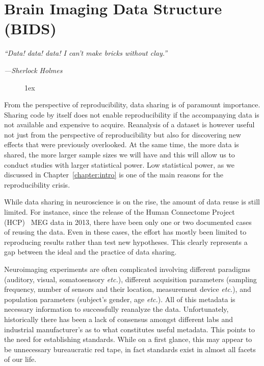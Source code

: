 \chapter{Brain Imaging Data Structure (BIDS)}
\label{chapter:bids}

\epigraph{\small\itshape ``Data! data! data! I can't make bricks without clay.''}
{\small\textit{---Sherlock Holmes}}

\begin{figure}[ht!]
\centering
\begingroup
\etocstandardlines
\renewcommand{\etocbelowtocskip}{0pt\relax}
\fboxsep1ex
\localtableofcontents
\endgroup
\end{figure}

\clearpage

From the perspective of reproducibility, data sharing is of paramount importance. Sharing code by itself does not enable reproducibility if the accompanying data is not available and expensive to acquire. Reanalysis of a dataset is however useful not just from the perspective of reproducibility but also for discovering new effects that were previously overlooked. At the same time, the more data is shared, the more larger sample sizes we will have and this will allow us to conduct studies with larger statistical power. Low statistical power, as we discussed in Chapter~\ref{chapter:intro} is one of the main reasons for the reproducibility crisis.

While data sharing in neuroscience is on the rise, the amount of data reuse is still limited. For instance, since the release of the Human Connectome Project (HCP)~\citep{larson2013adding} MEG data in 2013, there have been only one or two documented cases~\citep{jas2017autoreject} of reusing the data. Even in these cases, the effort has mostly been limited to reproducing results rather than test new hypotheses. This clearly represents a gap between the ideal and the practice of data sharing. 


Neuroimaging experiments are often complicated involving different paradigms (auditory, visual, somatosensory \emph{etc.}), different acquisition parameters (sampling frequency, number of sensors and their location, measurement device \emph{etc.}), and population parameters (subject's gender, age \emph{etc.}). All of this metadata is necessary information to successfully reanalyze the data. Unfortunately, historically there has been a lack of consensus amongst different labs and industrial manufacturer's as to what constitutes useful metadata. This points to the need for establishing standards. While on a first glance, this may appear to be unnecessary bureaucratic red tape, in fact standards exist in almost all facets of our life. 

